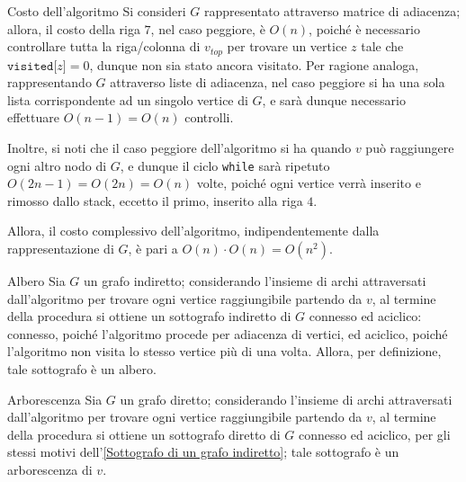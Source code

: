 \documentclass[a4paper, 12pt]{report}
\begin{document}
    \begin{framedobs}{Costo dell'algoritmo}
        Si consideri $G$ rappresentato attraverso matrice di adiacenza; allora, il costo della riga $7$, nel caso peggiore, è $O(n)$, poiché è necessario controllare tutta la riga/colonna di $v_{top}$ per trovare un vertice $z$ tale che $\texttt{visited[}z\texttt{]} = 0$, dunque non sia stato ancora visitato. Per ragione analoga, rappresentando $G$ attraverso liste di adiacenza, nel caso peggiore si ha una sola lista corrispondente ad un singolo vertice di $G$, e sarà dunque necessario effettuare $O(n - 1) = O(n)$ controlli.

        Inoltre, si noti che il caso peggiore dell'algoritmo si ha quando $v$ può raggiungere ogni altro nodo di $G$, e dunque il ciclo \texttt{while} sarà ripetuto $O(2n - 1) = O(2n) = O(n)$ volte, poiché ogni vertice verrà inserito e rimosso dallo stack, eccetto il primo, inserito alla riga $4$.

        Allora, il costo complessivo dell'algoritmo, indipendentemente dalla rappresentazione di $G$, è pari a $O(n) \cdot O(n) = O(n^2)$.
    \end{framedobs}

    \begin{framedobs}{Albero}
        \label{Sottografo di un grafo indiretto}
        Sia $G$ un grafo indiretto; considerando l'insieme di archi attraversati dall'algoritmo per trovare ogni vertice raggiungibile partendo da $v$, al termine della procedura si ottiene un sottografo indiretto di $G$ connesso ed aciclico: connesso, poiché l'algoritmo procede per adiacenza di vertici, ed aciclico, poiché l'algoritmo non visita lo stesso vertice più di una volta. Allora, per definizione, tale sottografo è un albero.
    \end{framedobs}

    \begin{framedobs}{Arborescenza}
        Sia $G$ un grafo diretto; considerando l'insieme di archi attraversati dall'algoritmo per trovare ogni vertice raggiungibile partendo da $v$, al termine della procedura si ottiene un sottografo diretto di $G$ connesso ed aciclico, per gli stessi motivi dell'\cref{Sottografo di un grafo indiretto}; tale sottografo è un arborescenza di $v$.
    \end{framedobs}
\end{document}
